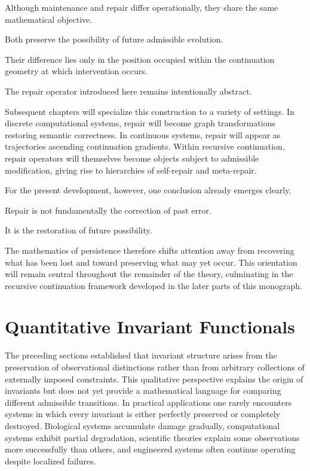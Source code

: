 \documentclass[11pt]{book}
\numberwithin{equation}{chapter}
\theoremstyle{definition}
\theoremstyle{plain}
\begin{document}
Although maintenance and repair differ operationally, they share the same mathematical objective.

Both preserve the possibility of future admissible evolution.

Their difference lies only in the position occupied within the continuation geometry at which intervention occurs.

The repair operator introduced here remains intentionally abstract.

Subsequent chapters will specialize this construction to a variety of settings. In discrete computational systems, repair will become graph transformations restoring semantic correctness. In continuous systems, repair will appear as trajectories ascending continuation gradients. Within recursive continuation, repair operators will themselves become objects subject to admissible modification, giving rise to hierarchies of self-repair and meta-repair.

For the present development, however, one conclusion already emerges clearly.

Repair is not fundamentally the correction of past error.

It is the restoration of future possibility.

The mathematics of persistence therefore shifts attention away from recovering what has been lost and toward preserving what may yet occur. This orientation will remain central throughout the remainder of the theory, culminating in the recursive continuation framework developed in the later parts of this monograph.

\section{Quantitative Invariant Functionals}

The preceding sections established that invariant structure arises from the preservation of observational distinctions rather than from arbitrary collections of externally imposed constraints. This qualitative perspective explains the origin of invariants but does not yet provide a mathematical language for comparing different admissible transitions. In practical applications one rarely encounters systems in which every invariant is either perfectly preserved or completely destroyed. Biological systems accumulate damage gradually, computational systems exhibit partial degradation, scientific theories explain some observations more successfully than others, and engineered systems often continue operating despite localized failures.
\end{document}

